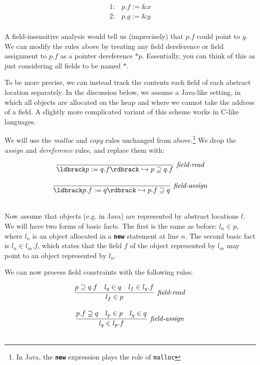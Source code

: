 \documentclass[11pt]{article}
\begin{document}
\[
\begin{array}{ll}
1: & p.f := \&x\\
2: & p.g := \&y\\
\end{array}
\]

A field-insensitive analysis would tell us (imprecisely) that $p.f$ could point
to $y$. We can modify the rules above by treating any field dereference or field
assignment to $p.f$ as a pointer dereference $*p$. Essentially, you can think of
this as just considering all fields to be named $*$.

To be more precise, we can instead track the contents each field of each abstract
location separately. In the discussion below, we assume a Java-like setting, in
which all objects are allocated on the heap and where we cannot take the address
of a field. A slightly more complicated variant of this scheme works in C-like
languages.

We will use the \textit{malloc} and \textit{copy} rules unchanged from
above.\footnote{In Java, the \texttt{\textbf{new}} expression plays the role of
  \texttt{malloc}} We drop the \textit{assign} and \textit{dereference} rules,
and replace them with: 

\[
\begin{array}{c}
\infer[\textit{field-read}]
	{\parg{p := q.f} \hookrightarrow p \supseteq q.f}
	{}\\[3ex]
	
\infer[\textit{field-assign}]
	{\parg{p.f := q} \hookrightarrow p.f \supseteq q}
	{}\\[3ex]
	
\end{array}
\]


Now assume that objects (e.g. in Java) are represented by abstract locations
$l$. We will have two forms of basic facts. The first is the same as before:
$l_n \in p$, where $l_n$ is an object allocated in a \texttt{\textbf{new}}
statement at line $n$. The second basic fact is $l_n \in l_m.f$, which states
that the field $f$ of the object represented by $l_m$ may point to an object
represented by $l_n$.

We can now process field constraints with the following rules:

\[
\begin{array}{c}
\infer[\textit{field-read}]
	{l_f \in p}
	{p \supseteq q.f & l_q \in q & l_f \in l_q.f}\\[3ex]
	
\infer[\textit{field-assign}]
	{l_q \in l_p.f}
	{p.f \supseteq q & l_p \in p & l_q \in q}\\[3ex]
	
\end{array}
\]
\end{document}
